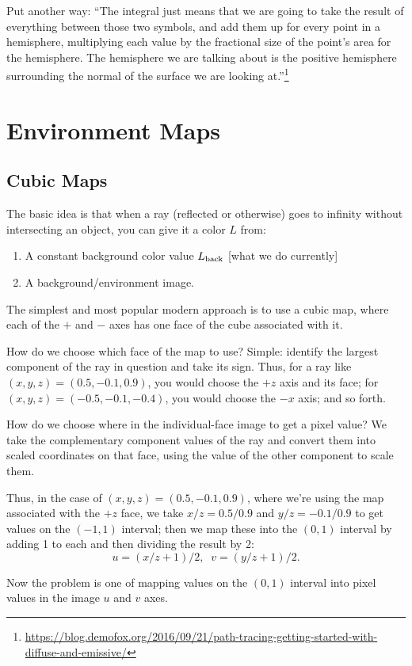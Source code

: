 \documentclass[11pt]{article}
\begin{document}
Put another way: ``The integral just means that we are going to take the
result of everything between those two symbols, and add them up for
every point in a hemisphere, multiplying each value by the fractional
size of the point’s area for the hemisphere. The hemisphere we are
talking about is the positive hemisphere surrounding the normal of the
surface we are looking at.''\footnote{\url{https://blog.demofox.org/2016/09/21/path-tracing-getting-started-with-diffuse-and-emissive/}}




\section{Environment Maps}

\subsection{Cubic Maps}

The basic idea is that when a ray (reflected or otherwise) goes to infinity without
intersecting an object, you can give it a color $L$ from:
\begin{enumerate}
\item A constant background color value $L_{\rm back}$ [what we do currently]

\item A background/environment image.
\end{enumerate}

The simplest and most popular modern approach is to use a cubic map, where each of the
$+$ and $-$ axes has one face of the cube associated with it.

How do we choose which face of the map to use? Simple: identify the largest component
of the ray in question and take its sign. Thus, for a ray like $(x, y, z) = (0.5, -0.1, 0.9)$,
you would choose the $+z$ axis and its face; for $(x, y, z) = (-0.5, -0.1, -0.4)$, you
would choose the $-x$ axis; and so forth.

How do we choose where in the individual-face image to get a pixel value? We take the
complementary component values of the ray and convert them into scaled coordinates on that face,
using the value of the other component to scale them.

Thus, in the case of $(x, y, z) = (0.5, -0.1, 0.9)$, where we're using the map associated
with the $+z$ face, we take $x/z = 0.5/0.9$ and $y/z = -0.1/0.9$ to get values on the $(-1,1)$
interval; then we map these into the $(0,1)$ interval by adding 1 to each and then dividing the
result by 2:
\begin{equation}
u = (x/z + 1)/2, \; \; v = (y/z + 1)/2 .
\end{equation}

Now the problem is one of mapping values on the $(0,1)$ interval into pixel values
in the image $u$ and $v$ axes.
\end{document}
